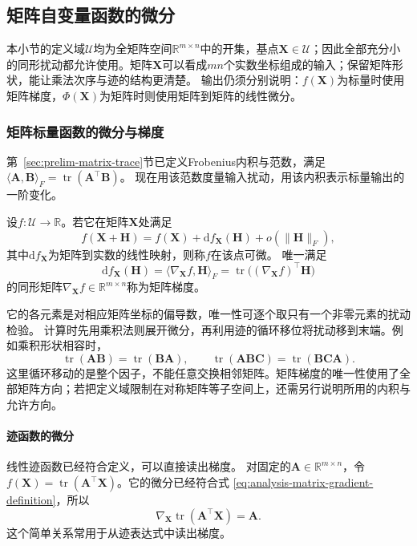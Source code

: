 \subsection{矩阵自变量函数的微分}

本小节的定义域$\mathcal U$均为全矩阵空间$\mathbb R^{m\times n}$中的开集，基点$\bm X\in\mathcal U$；因此全部充分小的同形扰动都允许使用。矩阵$\bm X$可以看成$mn$个实数坐标组成的输入；保留矩阵形状，能让乘法次序与迹的结构更清楚。
输出仍须分别说明：$f(\bm X)$为标量时使用矩阵梯度，$\Phi(\bm X)$为矩阵时则使用矩阵到矩阵的线性微分。

\subsubsection{矩阵标量函数的微分与梯度}

第~\ref{sec:prelim-matrix-trace}节已定义Frobenius内积与范数，满足$\langle\bm A,\bm B\rangle_F=\operatorname{tr}(\bm A^\top\bm B)$。
现在用该范数度量输入扰动，用该内积表示标量输出的一阶变化。
\begin{definition}[矩阵标量函数的梯度]
\label{def:multivariable-matrix-scalar-gradient}
设$f:\mathcal U\to\mathbb R$。若它在矩阵$\bm X$处满足
\[
 f(\bm X+\bm H)=f(\bm X)+\mathrm df_{\bm X}(\bm H)+o(\lVert\bm H\rVert_F),
\]
其中$\mathrm df_{\bm X}$为矩阵到实数的线性映射，则称$f$在该点可微。
唯一满足
\begin{equation}
 \mathrm df_{\bm X}(\bm H)=\langle\nabla_{\bm X}f,\bm H\rangle_F
 =\operatorname{tr}\bigl((\nabla_{\bm X}f)^\top\bm H\bigr)
\label{eq:analysis-matrix-gradient-definition}
\end{equation}
的同形矩阵$\nabla_{\bm X}f\in\mathbb R^{m\times n}$称为矩阵梯度。
\end{definition}
它的各元素是对相应矩阵坐标的偏导数，唯一性可逐个取只有一个非零元素的扰动检验。
计算时先用乘积法则展开微分，再利用迹的循环移位将扰动移到末端。例如乘积形状相容时，
\[
 \operatorname{tr}(\bm A\bm B)=\operatorname{tr}(\bm B\bm A),\qquad
 \operatorname{tr}(\bm A\bm B\bm C)=\operatorname{tr}(\bm B\bm C\bm A).
\]
这里循环移动的是整个因子，不能任意交换相邻矩阵。矩阵梯度的唯一性使用了全部矩阵方向；若把定义域限制在对称矩阵等子空间上，还需另行说明所用的内积与允许方向。

\paragraph{迹函数的微分}
线性迹函数已经符合定义，可以直接读出梯度。
对固定的$\bm{A}\in\mathbb{R}^{m\times n}$，令 $f(\bm{X})=\operatorname{tr}(\bm{A}^{\top}\bm{X})$。它的微分已经符合式
\eqref{eq:analysis-matrix-gradient-definition}，所以
\begin{equation}
  \nabla_{\bm{X}}\operatorname{tr}(\bm{A}^{\top}\bm{X})
  =\bm{A}.
\label{eq:analysis-trace-linear-gradient}
\end{equation}
这个简单关系常用于从迹表达式中读出梯度。


